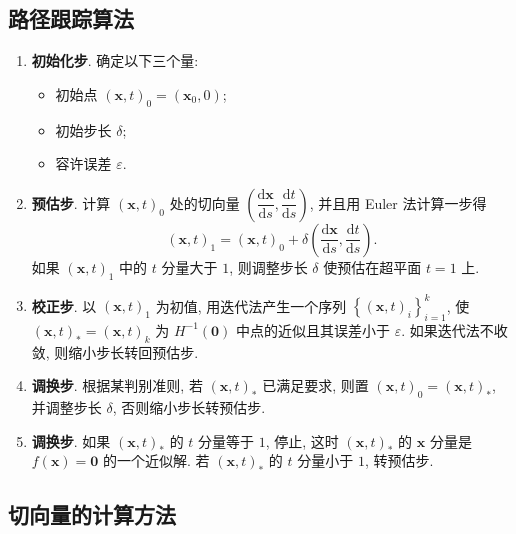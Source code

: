 \subsection{路径跟踪算法}

\begin{enumerate}
  \item \textbf{初始化步}. 确定以下三个量:
    \begin{itemize}
      \item 初始点 \((\boldsymbol{x},t)_0=(\boldsymbol{x}_0,0)\);
      \item 初始步长 \(\delta\);
      \item 容许误差 \(\varepsilon\).
    \end{itemize}
  \item \textbf{预估步}. 计算 \((\boldsymbol{x},t)_0\) 处的切向量 \(\left(\dfrac{\mathrm{d} \boldsymbol{x}}{\mathrm{d} s},\dfrac{\mathrm{d} t}{\mathrm{d} s}\right)\), 并且用 Euler 法计算一步得
    \begin{equation*}
      (\boldsymbol{x},t)_1=(\boldsymbol{x},t)_0+\delta \left(\frac{\mathrm{d} \boldsymbol{x}}{\mathrm{d} s},\frac{\mathrm{d} t}{\mathrm{d} s}\right).
    \end{equation*}
    如果 \((\boldsymbol{x},t)_1\) 中的 \(t\) 分量大于 \(1\), 则调整步长 \(\delta\) 使预估在超平面 \(t=1\) 上.
  \item \textbf{校正步}. 以 \((\boldsymbol{x},t)_1\) 为初值, 用迭代法产生一个序列 \(\left\lbrace(\boldsymbol{x},t)_i\right\rbrace_{i=1}^k\), 使 \((\boldsymbol{x},t)_*=(\boldsymbol{x},t)_k\) 为 \(H^{-1}(\boldsymbol{0})\) 中点的近似且其误差小于 \(\varepsilon\). 如果迭代法不收敛, 则缩小步长转回预估步.
  \item \textbf{调换步}. 根据某判别准则, 若 \((\boldsymbol{x},t)_*\) 已满足要求, 则置 \((\boldsymbol{x},t)_0=(\boldsymbol{x},t)_*\), 并调整步长 \(\delta\), 否则缩小步长转预估步.
  \item \textbf{调换步}. 如果 \((\boldsymbol{x},t)_*\) 的 \(t\) 分量等于 \(1\), 停止, 这时 \((\boldsymbol{x},t)_*\) 的 \(\boldsymbol{x}\) 分量是 \(f(\boldsymbol{x})=\boldsymbol{0}\) 的一个近似解. 若 \((\boldsymbol{x},t)_*\) 的 \(t\) 分量小于 \(1\), 转预估步.
\end{enumerate}

\subsection{切向量的计算方法}
